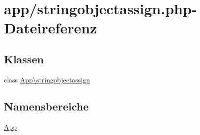 \hypertarget{stringobjectassign_8php}{}\section{app/stringobjectassign.php-\/\+Dateireferenz}
\label{stringobjectassign_8php}
\subsection*{Klassen}
\begin{DoxyCompactItemize}
\item 
class \hyperlink{classApp_1_1stringobjectassign}{App\textbackslash{}stringobjectassign}
\end{DoxyCompactItemize}
\subsection*{Namensbereiche}
\begin{DoxyCompactItemize}
\item 
 \hyperlink{namespaceApp}{App}
\end{DoxyCompactItemize}
